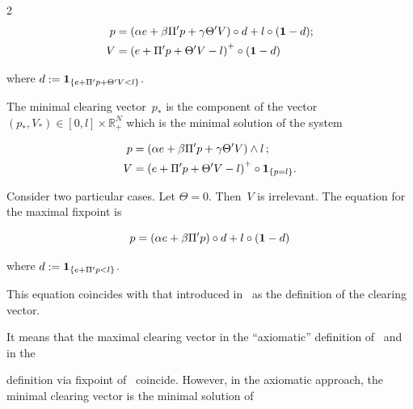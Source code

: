 \begin{multicols}{2}
\begin{align*}
    p& =  \left(\alpha e+\beta \Pi' p + \gamma \Theta' V\right) \circ d + l \circ ({\bf 1} - d); \\

     V &=  \left( e + \Pi' p +  \Theta' V - l\right)^+ \circ ({\bf 1} - d)

\end{align*}



\vspace*{-4pt}



\noindent

where $d := {\bf 1}_{\{e + \Pi' p + \Theta' V < l \}}$. 

 



The minimal clearing vector~$p_*$ is the  component of the vector  $(p_*, V_*)\in [0,l]\times \mathbb{R}^N_+$ which is the minimal solution of the system 

\begin{align*}

    p & =  \left(\alpha e+\beta \Pi' p + \gamma \Theta' V\right) \wedge l\,; \\

     V & = \left( e + \Pi' p +  \Theta' V - l\right)^+ \circ {\bf 1}_{\{p = l\}} .

\end{align*}



Consider two particular cases. Let $\Theta = 0$. Then~$V$ is irrelevant. The equation for the maximal fixpoint is

$$

p =   \left(\alpha e+\beta \Pi' p \right) \circ d + l \circ ({\bf 1} - d)

$$

where $d := {\bf 1}_{\{e + \Pi' p < l \}}$. 



\columnbreak





This equation coincides with that introduced in~\cite{RV2013} as the definition of the clearing vector. 

It means that the maximal clearing vector in the ``axiomatic'' definition of~\cite{Ararat2019} and in the  

definition via fixpoint of~\cite{RV2013} coincide. However, in the axiomatic approach, the minimal clearing vector is the minimal solution of 


\end{multicols}
